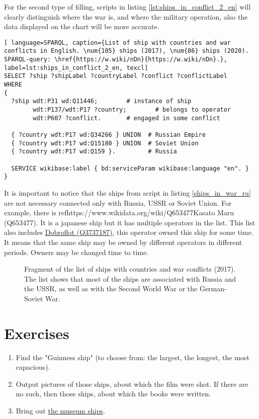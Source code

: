 For the second type of filling, scripts in listing \ref{lst:ships_in_conflict_2_en} will clearly distinguish where the war is, and where the military operation, also the data displayed on the chart will be more accurate.

\begin{lstlisting}[ language=SPARQL, caption={List of ship with countries and war conflicts in English. \num{105} ships (2017), \num{86} ships (2020). SPARQL-query: \href{https://w.wiki/nDn}{https://w.wiki/nDn}.}, label=lst:ships_in_conflict_2_en, texcl]
SELECT ?ship ?shipLabel ?countryLabel ?conflict ?conflictLabel
WHERE
{
  ?ship wdt:P31 wd:Q11446;        # instance of ship
        wdt:P137/wdt:P17 ?country;        # belongs to operator
        wdt:P607 ?conflict.       # engaged in some conflict
      
  { ?country wdt:P17 wd:Q34266 } UNION  # Russian Empire
  { ?country wdt:P17 wd:Q15180 } UNION  # Soviet Union
  { ?country wdt:P17 wd:Q159 }.         # Russia
      
  SERVICE wikibase:label { bd:serviceParam wikibase:language "en". }
}
\end{lstlisting}

It is important to notice that the ships from script in listing \ref{ships_in_war_ru} are not necessary connected only with Russia, USSR or Soviet Union.
For example, there is ref{https://www.wikidata.org/wiki/Q653477}{Kasato Maru (Q653477)}. It is a japanese ship but it has multiple operators in the list. This list also includes \href{https://www.wikidata.org/wiki/Q3737187}{Dobroflot (Q3737187)}, this operator owned this ship for some time. It means that the same ship may be owned by different operators in different periods. Owners may be changed time to time.


\begin{figure*}[ht]
  {
  \setlength{\fboxsep}{0pt}%
  \setlength{\fboxrule}{1pt}%
  }
    \caption[List of ships with countries and war conflicts]{Fragment of the list of ships with countries and war conflicts (2017). The list shows that most of the ships are associated with Russia and the USSR, as well as with the Second World War or the German-Soviet War.}%
    \label{fig:ships_by_country_and_conflict}%
\end{figure*}

\section{Exercises}

\begin{enumerate}
  \label{ship_tasks}
  \item Find the "Guinness ship" (to choose from: the largest, the longest, the most capacious).
  \item Output pictures of those ships, about which the film were shot. If there are no such, then those ships, about which the books were written.
  \item Bring out \href{https://en.wikipedia.org/wiki/List_of_museum_ships}{the museum ships}.
\end{enumerate}


